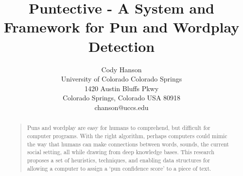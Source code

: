 \documentclass[letterpaper]{article}
\begin{document}
\title{Puntective - A System and Framework for Pun and Wordplay Detection}
\author{Cody Hanson\\
University of Colorado Colorado Springs\\
1420 Austin Bluffs Pkwy\\
Colorado Springs, Colorado USA 80918\\
chanson@uccs.edu}
\maketitle
\begin{abstract}
\begin{quote}
Puns and wordplay are easy for humans to comprehend, but difficult for computer programs.
With the right algorithm, perhaps computers could mimic the way that humans can make connections between words, sounds, the current social setting, all while drawing from deep knowledge bases. 
This research proposes a set of heuristics, techniques, and enabling data structures for allowing a computer to assign a `pun confidence score' to a piece of text.
\end{quote}
\end{abstract}









 

\end{document}
